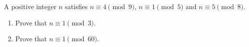 A positive integer $n$ satisfies $n\equiv4\pmod9$, $n\equiv1\pmod5$ and $n\equiv5\pmod8$.
\begin{enumerate}
\item[(a)] Prove that $n\equiv1\pmod3$.
\item[(b)] Prove that $n\equiv1\pmod{60}$.
\end{enumerate}
